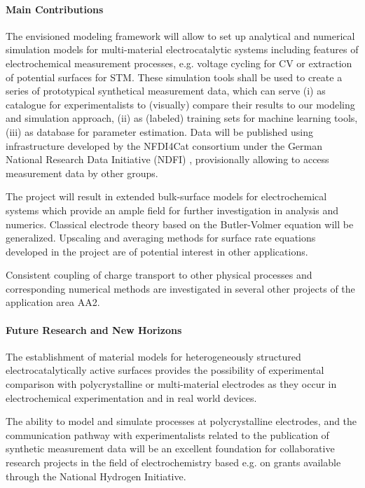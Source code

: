 \documentclass[a4paper,10pt]{article}
\begin{document}
\paragraph{Main Contributions}
The envisioned modeling framework will allow to set up analytical and numerical simulation models for multi-material electrocatalytic systems including  features of  electrochemical measurement processes, e.g. voltage cycling for CV or extraction of potential surfaces for STM.
These simulation tools shall be used to create a series of prototypical synthetical measurement data, which can serve (i) as catalogue for experimentalists to (visually) compare their results to our modeling and simulation approach, (ii) as (labeled)  training sets for machine learning tools,  (iii) as database for parameter estimation. Data will be published using infrastructure developed by the NFDI4Cat consortium under the German National Research Data Initiative (NDFI) \cite{NFDI4Cat}, provisionally allowing to access measurement data by other groups.

The project will result in extended bulk-surface models for electrochemical systems which provide an ample field for further investigation in analysis and numerics. 
Classical electrode theory based on the Butler-Volmer equation will be generalized.  Upscaling and averaging methods for surface rate equations developed in the project are of potential interest in other applications.

Consistent coupling of charge transport to other physical processes and
corresponding numerical methods are investigated in several other projects of the application area AA2.

\paragraph{Future Research and New Horizons}
The establishment of material models for heterogeneously structured electrocatalytically active surfaces
provides the possibility of experimental comparison with polycrystalline or  multi-material electrodes
as they occur in electrochemical experimentation and in real world devices.

The ability to model and simulate processes at polycrystalline electrodes, and the communication pathway with experimentalists related to the publication of synthetic measurement data will be an excellent foundation
for collaborative research projects in the field of electrochemistry based e.g. on grants available through
the National Hydrogen Initiative.
\end{document}
